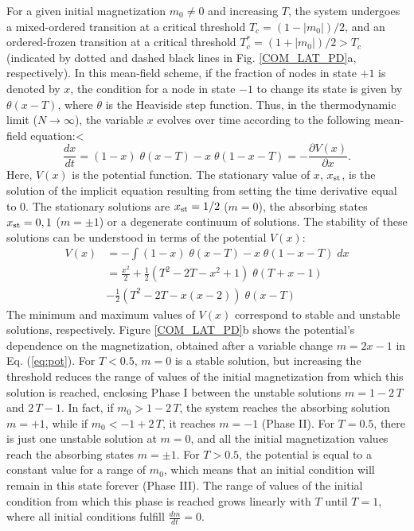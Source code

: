 For a given initial magnetization $m_0 \neq 0$ and increasing $T$, the system undergoes a mixed-ordered transition at a critical threshold $T_{c} = (1-|m_0|)/2$, and an ordered-frozen transition at a critical threshold $T_{c}^{*} = (1 + |m_0|)/2 > T_{c}$ (indicated by dotted and dashed black lines in Fig. \ref{COM_LAT_PD}a, respectively). In this mean-field scheme, if the fraction of nodes in state $+1$ is denoted by $x$, the condition for a node in state $-1$ to change its state is given by $\theta(x - T)$, where  $\theta$ is the Heaviside step function. Thus, in the thermodynamic limit ($N\to \infty$), the variable $x$ evolves over time according to the following mean-field equation:<
\begin{equation}
	\frac{dx}{dt} = (1 - x) \; \theta(x - T) - x \; \theta(1 - x - T) = - \frac{\partial V(x)}{\partial x}.
\end{equation}
Here, $V(x)$ is the potential function. The stationary value of $x$, $x_{\rm st}$, is the solution of the implicit equation resulting from setting the time derivative equal to $0$. The stationary solutions are $x_{\rm st} = 1/2$ ($m =0$), the absorbing states $x_{\rm st} = 0,1$ ($m = \pm 1$) or a degenerate continuum of solutions. The stability of these solutions can be understood in terms of the potential $V(x)$:
\begin{eqnarray}
	\label{eq:pot}
	V(x) &=-\int (1 - x) \; \theta(x - T) - x \; \theta(1 - x - T) \; dx \nonumber\\
	&=\frac{x^2}{2} + \frac{1}{2} \left( T^2 - 2T - x^2 + 1\right) \; \theta(T+x-1)\\
	&- \frac{1}{2} \left( T^2 - 2T - x(x-2)\right) \; \theta(x - T)\nonumber
\end{eqnarray}
The minimum and maximum values of $V(x)$ correspond to stable and unstable solutions, respectively. Figure \ref{COM_LAT_PD}b shows the potential's dependence on the magnetization, obtained after a variable change $m = 2x-1$ in Eq. (\ref{eq:pot}). For $T < 0.5$, $m = 0$ is a stable solution, but increasing the threshold reduces the range of values of the initial magnetization from which this solution is reached, enclosing Phase I between the unstable solutions $m = 1-2\, T$ and $2\, T-1$. In fact, if $m_0 > 1-2\, T$, the system reaches the absorbing solution $m=+1$, while if $m_0 < -1+2\, T$, it reaches $m=-1$ (Phase II). For $T = 0.5$, there is just one unstable solution at $m=0$, and all the initial magnetization values reach the absorbing states $m=\pm 1$. For $T > 0.5$, the potential is equal to a constant value for a range of $m_0$, which means that an initial condition will remain in this state forever (Phase III). The range of values of the initial condition from which this phase is reached grows linearly with $T$ until $T=1$, where all initial conditions fulfill $\frac{dm}{dt}=0$.

